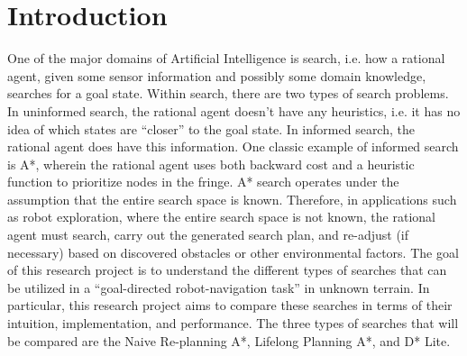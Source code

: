 
\section{Introduction}
	One of the major domains of Artificial Intelligence is search, i.e. how a rational agent, given some sensor information and possibly some domain knowledge, searches for a goal state. Within search, there are two types of search problems. In uninformed search, the rational agent doesn't have any heuristics, i.e. it has no idea of which states are ``closer'' to the goal state. In informed search, the rational agent does have this information. 
	One classic example of informed search is A*, wherein the rational agent uses both backward cost and a heuristic function to prioritize nodes in the fringe. A* search operates under the assumption that the entire search space is known. Therefore, in applications such as robot exploration, where the entire search space is not known, the rational agent must search, carry out the generated search plan, and re-adjust (if necessary) based on discovered obstacles or other environmental factors. 
	The goal of this research project is to understand the different types of searches that can be utilized in a ``goal-directed robot-navigation task'' in unknown terrain. In particular, this research project aims to compare these searches in terms of their intuition, implementation, and performance. The three types of searches that will be compared are the Naive Re-planning A*, Lifelong Planning A*, and D* Lite.
